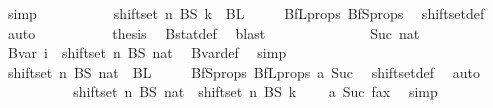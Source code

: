 \begin{isabellebody}
\ simp\isanewline
\ \ \ \ \ \ \ \isamarkupfalse%
\ \isamarkupfalse%
\ {\isachardoublequoteopen}shiftset\ n\ {\isacharparenleft}{\kern0pt}BS\ k{\isacharparenright}{\kern0pt}\ {\isasyminter}\ BL\ {}\ {\isacharequal}{\kern0pt}\ {\isacharbraceleft}{\kern0pt}{\isacharbraceright}{\kern0pt}{\isachardoublequoteclose}\ \isamarkupfalse%
\ BfL{\isacharunderscore}{\kern0pt}props\ BfS{\isacharunderscore}{\kern0pt}props\ \isamarkupfalse%
\ shiftset{\isacharunderscore}{\kern0pt}def\ \isamarkupfalse%
\ auto\isanewline
\ \ \ \ \ \ \ \isamarkupfalse%
\ \isamarkupfalse%
\ {\isacharquery}{\kern0pt}thesis\ \isamarkupfalse%
\ Bstat{\isacharunderscore}{\kern0pt}def\ \isamarkupfalse%
\ blast\isanewline
\ \ \ \ \ \isamarkupfalse%
\isanewline
\ \ \ \ \ \ \ \isamarkupfalse%
\ {\isacharparenleft}{\kern0pt}Suc\ nat{\isacharparenright}{\kern0pt}\isanewline
\ \ \ \ \ \ \ \isamarkupfalse%
\ \isamarkupfalse%
\ {\isachardoublequoteopen}Bvar\ i\ {\isacharequal}{\kern0pt}\ shiftset\ n\ {\isacharparenleft}{\kern0pt}BS\ nat{\isacharparenright}{\kern0pt}{\isachardoublequoteclose}\ \isamarkupfalse%
\ Bvar{\isacharunderscore}{\kern0pt}def\ \isamarkupfalse%
\ simp\isanewline
\ \ \ \ \ \ \ \isamarkupfalse%
\ \isamarkupfalse%
\ {\isachardoublequoteopen}shiftset\ n\ {\isacharparenleft}{\kern0pt}BS\ nat{\isacharparenright}{\kern0pt}\ {\isasyminter}\ BL\ {}\ {\isacharequal}{\kern0pt}\ {\isacharbraceleft}{\kern0pt}{\isacharbraceright}{\kern0pt}{\isachardoublequoteclose}\ \isamarkupfalse%
\ BfS{\isacharunderscore}{\kern0pt}props\ BfL{\isacharunderscore}{\kern0pt}props\ a\ Suc\ \isamarkupfalse%
\ shiftset{\isacharunderscore}{\kern0pt}def\ \isamarkupfalse%
\ auto\isanewline
\ \ \ \ \ \ \ \isamarkupfalse%
\ \isamarkupfalse%
\ {\isachardoublequoteopen}shiftset\ n\ {\isacharparenleft}{\kern0pt}BS\ nat{\isacharparenright}{\kern0pt}\ {\isasyminter}\ shiftset\ n\ {\isacharparenleft}{\kern0pt}BS\ k{\isacharparenright}{\kern0pt}\ {\isacharequal}{\kern0pt}\ {\isacharbraceleft}{\kern0pt}{\isacharbraceright}{\kern0pt}{\isachardoublequoteclose}\ \isamarkupfalse%
\ a\ Suc\ fax{}\ \isamarkupfalse%
\ simp\isanewline
\ \ \ \ \ \ \ \isamarkupfalse%

\end{isabellebody}
